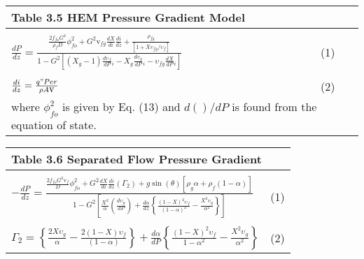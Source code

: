 \documentclass[12pt,fleqn]{report}
\begin{document}
{\newpage
\clearpage
\samepage \begin{tabular}%
{*{2}{l}}
\multicolumn{2}{l}{\bf Table  3.5  HEM Pressure Gradient Model} \\ [5mm] \hline
  &  \\ 
$\frac{dP}{dz} = \frac{\frac{2f_{fo}G^{2}}{\rho_{f}D}\phi_{fo}^{2} + G^{2}\mbox{v}_{fg} \frac{dX}{di}\frac{di}{dz} + \frac{\rho_{fg}}{\left[ 1 + X\upsilon_{fg}/\upsilon_{f} \right]}}{1 - G^{2}\left[ \left( X_{g}-1 \right) \frac{d\upsilon_{f}}{dP}{}_{i} - X_{g}\frac{d\upsilon_{g}}{dP}{}_{i} - \upsilon_{fg}\frac{dX}{dP}{}_{i} \right] }$ & (1) \\ 
    &   \\ 
$\frac{di}{dz} = \frac{q"Per}{\rho A\mbox{v}}$ & (2)\\ [5mm] \hline
\multicolumn{2}{l}{where $\phi_{fo}^{2}$ is given by Eq. (13) and $d () / dP$ is found from the equation of state.}
\end{tabular}
}

{\newpage
\clearpage
\samepage \begin{tabular}{*{2}{l}}
\multicolumn{2}{l}{\bf Table  3.6  Separated Flow Pressure Gradient} \\ [5mm] \hline
  &   \\ 
$-\frac{dP}{dz} = \frac{\frac{2f_{fo}G^{2}\mbox{v}_{f}}{D}\phi_{fo}^{2} + G^{2}
\frac{dX}{di}\frac{di}{dz} (\Gamma_{2}) + g\sin(\theta)\left[ \rho_{g} \alpha +
\rho_{f}(1 - \alpha) \right]}{1 - G^{2}\left[ \frac{X^{2}}{\alpha} \left( 
\frac{d\upsilon_{g}}{dP} \right) + \frac{d\alpha}{dz} \left\{ \frac{\left( 1 - X \right)^{2}\upsilon_{f}}{\left(1 - \alpha \right)^{2}} - 
\frac{X^{2}\upsilon_{g}}{\alpha^{2}} \right\} \right]}$ & (1) \\ 
   &   \\ 
$\Gamma_{2} = \left\{ \frac{2X\upsilon_{g}}{\alpha} - \frac{2(1-X)\upsilon_{f}}{(1-\alpha)} \right\} + \frac{d\alpha}{dP} \left\{ \frac{\left( 1-X \right)^{2} \upsilon_{f}}{1-\alpha^{2}} - \frac{X^{2}\upsilon_{g}}{\alpha^{2}} \right\}$ & (2)\\ [5mm] \hline
\end{tabular}
}
\end{document}
